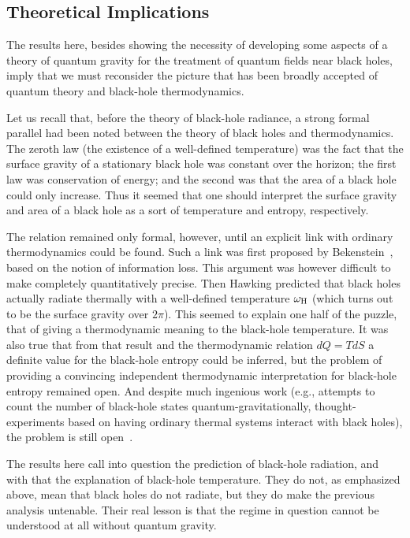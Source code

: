 \documentclass[12pt]{article}
\begin{document}
\subsection{Theoretical Implications}

The results here, besides showing the necessity of developing some aspects of a
theory of quantum gravity for the treatment of quantum fields near black holes,
imply that we must reconsider the picture that has been broadly accepted of
quantum theory and black-hole thermodynamics.

Let us recall that, before the theory of black-hole radiance, a strong formal
parallel had been noted between the theory of black holes and thermodynamics. 
The zeroth law (the existence of a well-defined temperature) was the fact that
the surface gravity of a stationary black hole was constant over the horizon;
the first law was conservation of energy; and the second was that the area of a
black hole could only increase.  Thus it seemed that one should interpret the
surface gravity and area of a black hole as a sort of temperature and entropy,
respectively.

The relation remained only formal, however, until an explicit link with
ordinary thermodynamics could be found.  Such a link was first proposed by
Bekenstein~\cite{Bekenstein:1973}, based on the notion of information loss. 
This argument was however difficult to make completely quantitatively precise. 
Then Hawking predicted that black holes actually radiate thermally with a
well-defined temperature $\omega _{\rm H}$ (which turns out to be the surface
gravity over $2\pi$).  This seemed to explain one half of the puzzle, that of
giving a thermodynamic meaning to the black-hole temperature.  It was also true
that from that result and the thermodynamic relation $dQ=TdS$ a definite value
for the black-hole entropy could be inferred, but the problem of providing a
convincing independent thermodynamic interpretation for black-hole entropy
remained open.  And despite much ingenious work (e.g., attempts to count the
number of black-hole states quantum-gravitationally, thought-experiments based
on having ordinary thermal systems interact with black holes), the problem is
still open~\cite{Helfer:2003}.

The results here call into question the prediction of black-hole radiation, and
with that the explanation of black-hole temperature.  They do not, as
emphasized above, mean that black holes do not radiate, but they do make the
previous analysis untenable.    Their real lesson is that the regime in
question cannot be understood at all without quantum gravity.
\end{document}
